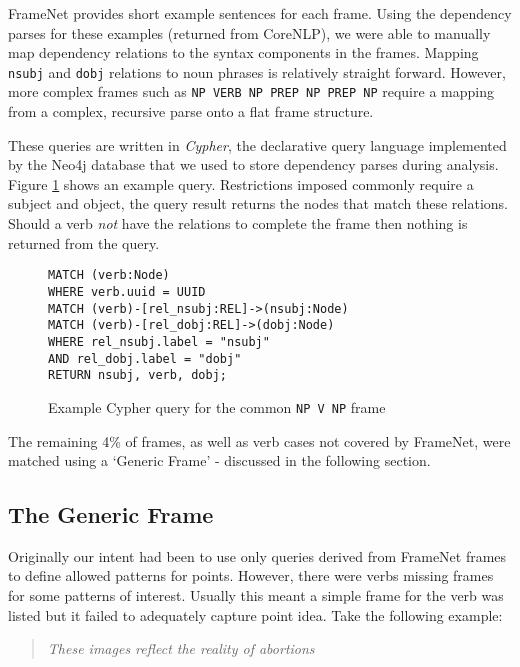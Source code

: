       FrameNet provides short example sentences for each frame. Using the dependency parses for these examples (returned from CoreNLP), we were able to manually map dependency relations to the syntax components in the frames. Mapping \texttt{nsubj} and \texttt{dobj} relations to noun phrases is relatively straight forward. However, more complex frames such as \texttt{NP VERB NP PREP NP PREP NP} require a mapping from a complex, recursive parse onto a flat frame structure.

      These queries are written in \textit{Cypher}, the declarative query language implemented by the Neo4j database that we used to store dependency parses during analysis. Figure \ref{fig:npvnpquery} shows an example query. Restrictions imposed commonly require a subject and object, the query result returns the nodes that match these relations. Should a verb \textit{not} have the relations to complete the frame then nothing is returned from the query.

      \begin{figure}
        \centering
        \caption{Example Cypher query for the common \texttt{NP V NP} frame}

        \begin{verbatim}
MATCH (verb:Node)
WHERE verb.uuid = UUID
MATCH (verb)-[rel_nsubj:REL]->(nsubj:Node)
MATCH (verb)-[rel_dobj:REL]->(dobj:Node)
WHERE rel_nsubj.label = "nsubj"
AND rel_dobj.label = "dobj"
RETURN nsubj, verb, dobj;
        \end{verbatim}
        \label{fig:npvnpquery}
      \end{figure}

      The remaining 4\% of frames, as well as verb cases not covered by FrameNet, were matched using a `Generic Frame' - discussed in the following section.

    \tocless\subsection{The Generic Frame}
      Originally our intent had been to use only queries derived from FrameNet frames to define allowed patterns for points. However, there were verbs missing frames for some patterns of interest. Usually this meant a simple frame for the verb was listed but it failed to adequately capture point idea. Take the following example:

      \bigskip
      \begin{center}
        \blockquote{\textit{These images reflect the reality of abortions}}
      \end{center}

